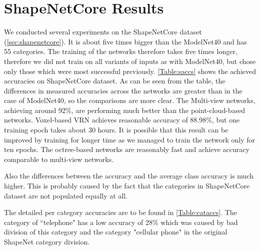 \section{ShapeNetCore Results}
We conducted several experiments on the ShapeNetCore dataset (\autoref{sec:shapenetcore}). It is about five times bigger than the ModelNet40 and has 55 categories. The training of the networks therefore takes five times longer, therefore we did not train on all variants of inputs as with ModelNet40, but chose only those which were most successful previously. \autoref{Table:saccs} shows the achieved accuracies on ShapeNetCore dataset.
As can be seen from the table, the differences in measured accuracies across the networks are greater than in the case of ModelNet40, so the comparisons are more clear. The Multi-view networks, achieving around 92\%, are performing much better than the point-cloud-based networks. Voxel-based VRN achieves reasonable accuracy of 88.98\%, but one training epoch takes about 30 hours. It is possible that this result can be improved by training for longer time as we managed to train the network only for ten epochs. The octree-based networks are reasonably fast and achieve accuracy comparable to multi-view networks.  \par
Also the differences between the accuracy and the average class accuracy is much higher. This is probably caused by the fact that the categories in ShapeNetCore dataset are not populated equally at all.\par



The detailed per category accuracies are to be found in \autoref{Table:cataccs}. The category of ``telephone" has a low accuracy of 28\% which was caused by bad division of this category and the category "cellular phone" in the original ShapeNet category division.



